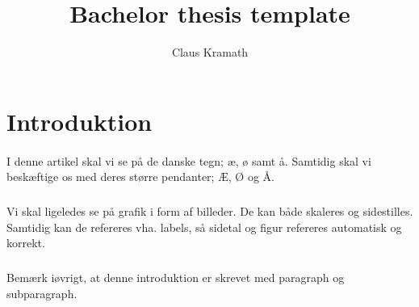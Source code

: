 \documentclass{article}
\title{Bachelor thesis template}
\author{Claus Kramath}
\begin{document}
\maketitle
\thispagestyle{empty}
\newpage
\tableofcontents
\thispagestyle{empty} 
\newpage
\section{Introduktion}
\paragraph{}
I denne artikel skal vi se på de danske tegn; æ, ø samt å. Samtidig skal vi beskæftige os med deres større pendanter; Æ, Ø og Å.
\subparagraph{}
Vi skal ligeledes se på grafik i form af billeder. De kan både skaleres og sidestilles. Samtidig kan de refereres vha. labels, så sidetal og figur refereres automatisk og korrekt.
\subparagraph{}
Bemærk iøvrigt, at denne introduktion er skrevet med paragraph og subparagraph.
\newpage
\end{document}
